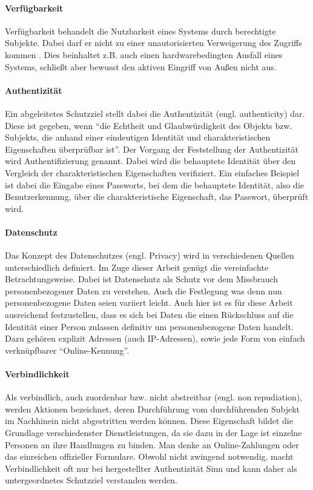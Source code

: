 \paragraph{Verfügbarkeit}
Verfügbarkeit behandelt die Nutzbarkeit eines Systems durch berechtigte Subjekte. Dabei darf er nicht zu einer unautorisierten Verweigerung des Zugriffs kommen \cite[p. 12]{Eckert2013}. Dies beinhaltet z.B. auch einen hardwarebedingten Ausfall eines Systems, schließt aber bewusst den aktiven Eingriff von Außen nicht aus.
 
\paragraph{Authentizität}
Ein abgeleitetes Schutzziel stellt dabei die Authentizität (engl. authenticity) dar. Diese ist gegeben, wenn  ``die Echtheit und Glaubwürdigkeit des Objekts bzw. Subjekts, die anhand einer eindeutigen Identität und charakteristischen Eigenschaften überprüfbar ist''\cite[p. 8]{Eckert2013}. Der Vorgang der Feststellung der Authentizität wird Authentifizierung genannt. Dabei wird die behauptete Identität über den Vergleich der charakteristischen Eigenschaften verifiziert. Ein einfaches Beispiel ist dabei die Eingabe eines Passworts, bei dem die behauptete Identität, also die Benutzerkennung, über die charakteristische Eigenschaft, das Passwort, überprüft wird.  

\paragraph{Datenschutz}
Das Konzept des Datenschutzes (engl. Privacy) wird in verschiedenen Quellen unterschiedlich definiert. Im Zuge dieser Arbeit genügt die vereinfachte Betrachtungsweise. Dabei ist Datenschutz als Schutz vor dem Missbrauch personenbezogener Daten zu verstehen. Auch die Festlegung was denn nun personenbezogene Daten seien variiert leicht. Auch hier ist es für diese Arbeit ausreichend festzustellen, dass es sich bei Daten die einen Rückschluss auf die Identität einer Person zulassen definitiv um personenbezogene Daten handelt. Dazu gehören explizit Adressen (auch IP-Adressen), sowie jede Form von einfach verknüpfbarer ``Online-Kennung''\cite{Schwenke2018}.     

\paragraph{Verbindlichkeit}
Als verbindlich, auch zuordenbar bzw. nicht abstreitbar (engl. non repudiation), werden Aktionen bezeichnet, deren Durchführung vom durchführenden Subjekt im Nachhinein nicht abgestritten werden können. Diese Eigenschaft bildet die Grundlage verschiedenster Dienstleistungen, da sie dazu in der Lage ist einzelne Personen an ihre Handlungen zu binden. Man denke an Online-Zahlungen oder das einreichen offizieller Formulare. Obwohl nicht zwingend notwendig, macht Verbindlichkeit oft nur bei hergestellter Authentizität Sinn und kann daher als untergeordnetes Schutzziel verstanden werden.

